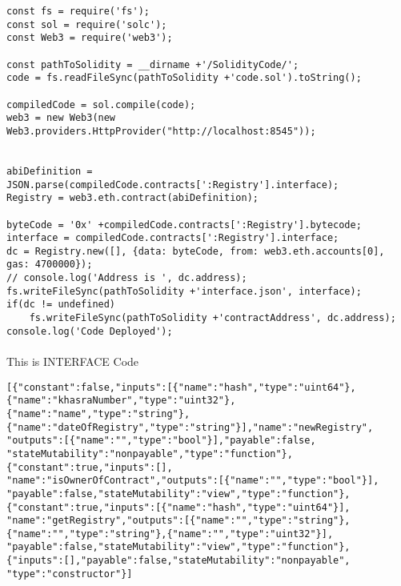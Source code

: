\begin{lstlisting}
const fs = require('fs');
const sol = require('solc');
const Web3 = require('web3');

const pathToSolidity = __dirname +'/SolidityCode/';
code = fs.readFileSync(pathToSolidity +'code.sol').toString();

compiledCode = sol.compile(code);
web3 = new Web3(new Web3.providers.HttpProvider("http://localhost:8545"));


abiDefinition = JSON.parse(compiledCode.contracts[':Registry'].interface);
Registry = web3.eth.contract(abiDefinition);

byteCode = '0x' +compiledCode.contracts[':Registry'].bytecode;
interface = compiledCode.contracts[':Registry'].interface;
dc = Registry.new([], {data: byteCode, from: web3.eth.accounts[0], gas: 4700000});
// console.log('Address is ', dc.address);
fs.writeFileSync(pathToSolidity +'interface.json', interface);
if(dc != undefined)
	fs.writeFileSync(pathToSolidity +'contractAddress', dc.address);
console.log('Code Deployed');
\end{lstlisting}
\paragraph{} This is INTERFACE Code 
\begin{lstlisting}
[{"constant":false,"inputs":[{"name":"hash","type":"uint64"},
{"name":"khasraNumber","type":"uint32"},{"name":"name","type":"string"},
{"name":"dateOfRegistry","type":"string"}],"name":"newRegistry",
"outputs":[{"name":"","type":"bool"}],"payable":false,
"stateMutability":"nonpayable","type":"function"},{"constant":true,"inputs":[],
"name":"isOwnerOfContract","outputs":[{"name":"","type":"bool"}],
"payable":false,"stateMutability":"view","type":"function"},
{"constant":true,"inputs":[{"name":"hash","type":"uint64"}],
"name":"getRegistry","outputs":[{"name":"","type":"string"},
{"name":"","type":"string"},{"name":"","type":"uint32"}],
"payable":false,"stateMutability":"view","type":"function"},
{"inputs":[],"payable":false,"stateMutability":"nonpayable",
"type":"constructor"}]
\end{lstlisting}
